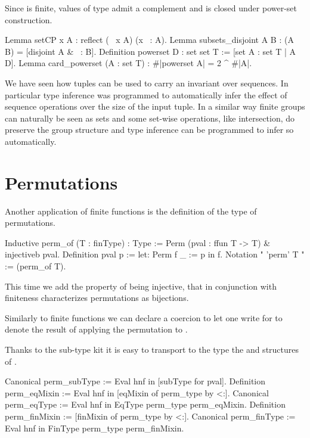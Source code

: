Since  is finite, values of type  admit a
complement and  is closed under power-set construction.

\begin{coq}{}{}
Lemma setCP x A : reflect (~ x \in A) (x \in ~: A).
Lemma subsets_disjoint A B : (A \subset B) = [disjoint A & ~: B].
Definition powerset D : {set {set T}} := [set A : {set T} | A \subset D].
Lemma card_powerset (A : {set T}) : #|powerset A| = 2 ^ #|A|.
\end{coq}

We have seen how tuples can be used to carry an invariant over
sequences. In particular type inference was programmed to
automatically infer the effect of sequence operations over the
size of the input tuple.  In a similar way finite groups can naturally
be seen as sets and some set-wise operations, like intersection,
do preserve the group structure and type inference can be programmed
to infer so automatically.

\section{Permutations}

Another application of finite functions is the definition of
the type of permutations.

\begin{coq}{}{}
Inductive perm_of (T : finType) : Type :=
  Perm (pval : {ffun T -> T}) & injectiveb pval.
Definition pval p := let: Perm f _ := p in f.
Notation "{ 'perm' T }" := (perm_of T).
\end{coq}

This time we add the property of being injective, that in conjunction
with finiteness characterizes permutations as bijections.

Similarly to finite functions we can declare a coercion to let
one write  for  to denote
the result of applying the permutation  to .

Thanks to the sub-type kit it is easy to transport to the type
 the  and  structures of .

\begin{coq}{}{}
Canonical perm_subType := Eval hnf in [subType for pval].
Definition perm_eqMixin := Eval hnf in [eqMixin of perm_type by <:].
Canonical perm_eqType := Eval hnf in EqType perm_type perm_eqMixin.
Definition perm_finMixin := [finMixin of perm_type by <:].
Canonical perm_finType := Eval hnf in FinType perm_type perm_finMixin.
\end{coq}

